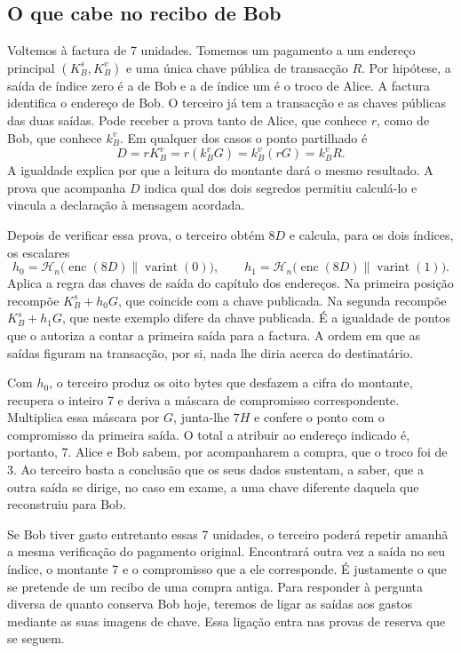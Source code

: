 \subsection{O que cabe no recibo de Bob}
\label{subsec:prova-factura-sete}

Voltemos à factura de 7 unidades. Tomemos um pagamento a um endereço
principal \((K_B^s,K_B^v)\) e uma única chave pública de transacção
\(R\). Por hipótese, a saída de índice zero é a de Bob e a de índice um
é o troco de Alice. A factura identifica o endereço de Bob. O terceiro
já tem a transacção e as chaves públicas das duas saídas. Pode receber a
prova tanto de Alice, que conhece \(r\), como de Bob, que conhece
\(k_B^v\). Em qualquer dos casos o ponto partilhado é
\[
    D=rK_B^v=r(k_B^vG)=k_B^v(rG)=k_B^vR .
\]
A igualdade explica por que a leitura do montante dará o mesmo
resultado. A prova que acompanha \(D\) indica qual dos dois segredos
permitiu calculá-lo e vincula a declaração à mensagem acordada.

Depois de verificar essa prova, o terceiro obtém \(8D\) e calcula,
para os dois índices, os escalares
\[
 h_0=\mathcal H_n\bigl(\operatorname{enc}(8D)\mathbin\|\operatorname{varint}(0)\bigr),
 \qquad
 h_1=\mathcal H_n\bigl(\operatorname{enc}(8D)\mathbin\|\operatorname{varint}(1)\bigr).
\]
Aplica a regra das chaves de saída do capítulo dos endereços. Na primeira
posição recompõe \(K_B^s+h_0G\), que coincide com a chave publicada.
Na segunda recompõe \(K_B^s+h_1G\), que neste exemplo difere da chave
publicada. É a igualdade de pontos que o autoriza a contar a primeira
saída para a factura. A ordem em que as saídas figuram na transacção,
por si, nada lhe diria acerca do destinatário.

Com \(h_0\), o terceiro produz os oito bytes que desfazem a cifra do
montante, recupera o inteiro 7 e deriva a máscara de compromisso
correspondente. Multiplica essa máscara por \(G\), junta-lhe \(7H\) e
confere o ponto com o compromisso da primeira saída. O total a atribuir
ao endereço indicado é, portanto, 7. Alice e Bob sabem, por acompanharem
a compra, que o troco foi de 3. Ao terceiro basta a conclusão que os seus
dados sustentam, a saber, que a outra saída se dirige, no caso em exame,
a uma chave diferente daquela que reconstruiu para Bob.

Se Bob tiver gasto entretanto essas 7 unidades, o terceiro poderá
repetir amanhã a mesma verificação do pagamento original. Encontrará
outra vez a saída no seu índice, o montante 7 e o compromisso que a
ele corresponde. É justamente o que se pretende de um recibo de uma
compra antiga. Para responder à pergunta diversa de quanto conserva Bob
hoje, teremos de ligar as saídas aos gastos mediante as suas imagens de
chave. Essa ligação entra nas provas de reserva que se seguem.
